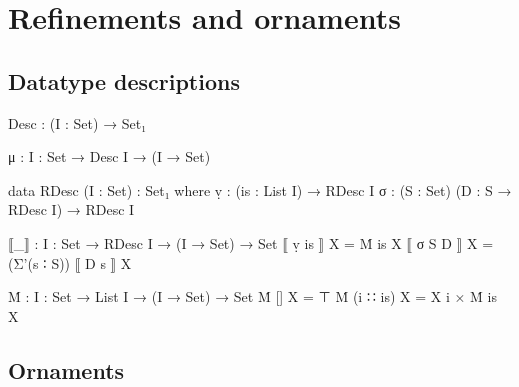 \chapter{Refinements and ornaments}
\label{chapter:ornaments}


\section{Datatype descriptions}

\begin{code}
Desc : (I : Set) → Set₁
\end{code}

\begin{code}
μ : {I : Set} → Desc I → (I → Set)
\end{code}

\begin{code}
data RDesc (I : Set) : Set₁ where
  ṿ  :  (is : List I) → RDesc I
  σ  :  (S : Set) (D : S → RDesc I) → RDesc I
  
⟦_⟧ : {I : Set} → RDesc I → (I → Set) → Set
⟦  ṿ is   ⟧  X  =  Ṁ is X
⟦  σ S D  ⟧  X  =  (Σ'(s ∶ S)) ⟦ D s ⟧ X
\end{code}

\begin{code}
Ṁ : {I : Set} → List I → (I → Set) → Set
Ṁ  []        X  =  ⊤
Ṁ  (i ∷ is)  X  =  X i × Ṁ is X
\end{code}


\section{Ornaments}

